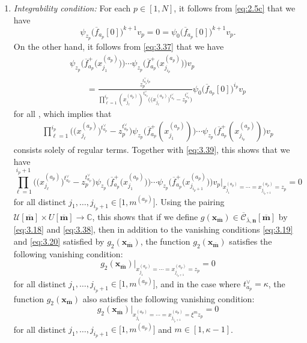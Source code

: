 \documentclass[pdftex]{sigma}
\numberwithin{equation}{section}
\begin{document}
\begin{enumerate}
\item[$(4)$] \emph{Integrability condition:} For each $p\in[1,N]$, it follows from \eqref{eq:2.5c} that we have
\begin{equation}\label{eq:3.39}
\psi_{z_p}\bigl(\overline{f}_{a_p}[0]\bigr)^{k+1}v_p
=0
=\psi_0\bigl(\overline{f}_{a_p}[0]\bigr)^{k+1}v_p.
\end{equation}
On the other hand, it follows from \eqref{eq:3.37} that we have
\begin{gather*}
\psi_{z_p}\bigl(\overline{f}_{a_p}^+\bigl(x_{j_1}^{(a_p)}\bigr)\bigr) \cdots\psi_{z_p}\bigl(\overline{f}_{a_p}^+\bigl(x_{j_{i_p}} ^{(a_p)}\bigr)\bigr) v_p\\
\qquad
=\frac{z_p^{t_{a_p}^{\vee}i_p}}{\prod_{\ell=1} ^{i_p}(x_{j_{\ell}}^{(a_p)})^{t_{a_p}^{\vee}}\bigl(\bigl(x_{j_{\ell}}^{(a_p)}\bigr) ^{t_{a_p}^{\vee}}-z_p^{t_{a_p}^{\vee}}\bigr)}\psi_0\bigl(\overline{f} _{a_p}[0]\bigr)^{i_p} v_p
\end{gather*}
for all , which implies that
\begin{gather*}
\prod_{\ell=1}^{i_p}\bigl(\bigl(x_{j_{\ell}}^{(a_p)}\bigr)^{t_{a_p}^{\vee}}-z_p^{t_{a_p}^{\vee}}\bigr)\psi_{z_p}\bigl(\overline{f}_{a_p}^+(x_{ j_1}^{(a_p)})\bigr)\cdots\psi_{z_p}\bigl(\overline{f}_{a_p}^+(x_{j_{i_p}}^{(a_p)})\bigr)v_p
\end{gather*}
consists solely of regular terms. Together with \eqref{eq:3.39}, this shows that we have
\begin{equation*}
\prod_{\ell=1}^{i_p+1}\bigl(\bigl(x_{j_{\ell}}^{(a_p)}\bigr)^{t_{a_p}^{\vee}}-z_p^{t_{a_p}^{\vee}}\bigr)\psi_{z_p}\bigl(\overline{f}_{a_p}^+\bigl(x_{ j_1}^{(a_p)}\bigr)\bigr)\cdots\psi_{z_p}\bigl(\overline{f}_{a_p}^+\bigl(x_{j_{i_p+1}}^{(a_p)}\bigr)\bigr)v_p\big|_{x_{j_1}^{(a_p)}=\cdots=x_{j_{i_p+1}}^{(a_p)}=z_p}=0
\end{equation*}
for all distinct $j_1,\dots,j_{i_p+1}\in\bigl[1,m^{(a_p)}\bigr]$. Using the pairing $\mathcal{U}[\overline{\mathbf{m}}]\times U[\overline{ \mathbf{m}}]\to\mathbb{C}$, this shows that if we define $g(\mathbf{x}_{\overline{\mathbf{m}}})\in\overline{ \mathcal{C}}_{\overline{\lambda},\mathbf{n}}[\overline{ \mathbf{m}}]$ by \eqref{eq:3.18} and \eqref{eq:3.38}, then in addition to the vanishing conditions \eqref{eq:3.19} and \eqref{eq:3.20} satisfied by $g_2(\mathbf{x}_{ \overline{\mathbf{m}}})$, the function $g_2(\mathbf{x}_{\overline{\mathbf{m}}})$ satisfies the following vanishing condition:
\begin{equation*}
g_2(\mathbf{x}_{\overline{\mathbf{m}}})|_{x_{j_1}^{(a_p)}=\cdots=x_{j_{i_p+1}}^{(a_p)}=z_p}=0
\end{equation*}
for all distinct $j_1,\dots,j_{i_p+1}\in\bigl[1,m^{(a_p)}\bigr]$, and in the case where $t_{a_p}^{\vee}=\kappa$, the function $g_2(\mathbf{x}_{\overline{\mathbf{m}}})$ also satisfies the following vanishing condition:
\begin{equation*}
g_2(\mathbf{x}_{\overline{\mathbf{m}}})|_{x_{j_1}^{(a_p)}=\cdots=x_{j_{i_p+1}}^{(a_p)}=\xi^m z_p}=0
\end{equation*}
for all distinct $j_1,\dots,j_{i_p+1}\in\bigl[1,m^{(a_p)}\bigr]$ and $m\in[1,\kappa-1]$.
\end{enumerate}
\end{document}
